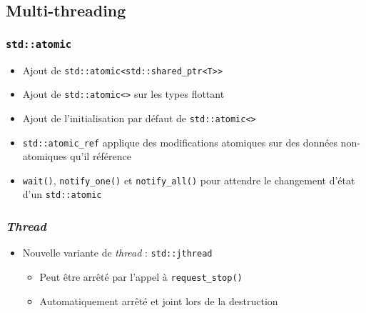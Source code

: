 \documentclass[C++.tex]{subfiles}
\begin{document}
\subsection*{Multi-threading}
\begin{frame}[fragile]
	\frametitle{\lstinline|std::atomic|}
	\begin{itemize}
		\item Ajout de \lstinline|std::atomic<std::shared_ptr<T>>|
		\item Ajout de \lstinline|std::atomic<>| sur les types flottant
		\item Ajout de l'initialisation par défaut de \lstinline|std::atomic<>|
		\item \lstinline|std::atomic_ref| applique des modifications atomiques sur des données non-atomiques qu'il référence
		\item \lstinline|wait()|, \lstinline|notify_one()| et \lstinline|notify_all()| pour attendre le changement d'état d'un \lstinline|std::atomic|
	\end{itemize}
\end{frame}

\begin{frame}[fragile]
	\frametitle{\textit{Thread}}
	\begin{itemize}
		\item Nouvelle variante de \textit{thread} : \lstinline|std::jthread|
		\begin{itemize}
			\item Peut être arrêté par l'appel à \lstinline|request_stop()|
			\item Automatiquement arrêté et joint lors de la destruction
		\end{itemize}

	\end{itemize}
\end{frame}
\end{document}
